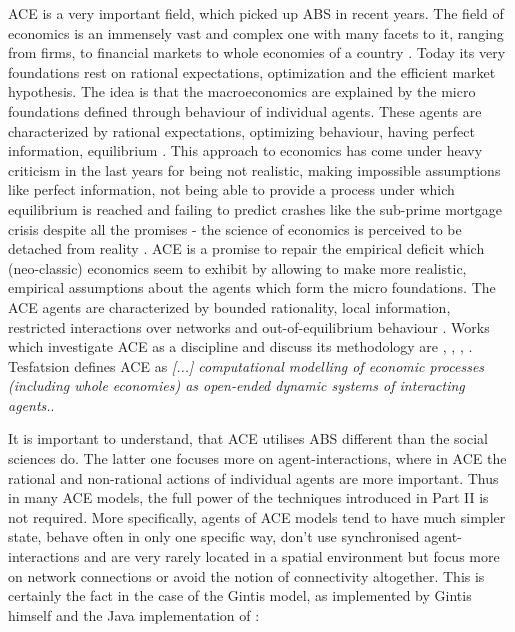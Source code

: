 ACE is a very important field, which picked up ABS in recent years. The field of economics is an immensely vast and complex one with many facets to it, ranging from firms, to financial markets to whole economies of a country \cite{bowles_understanding_2005}. Today its very foundations rest on rational expectations, optimization and the efficient market hypothesis. The idea is that the macroeconomics are explained by the micro foundations \cite{colell_microeconomic_1995} defined through behaviour of individual agents. These agents are characterized by rational expectations, optimizing behaviour, having perfect information, equilibrium \cite{focardi_is_2015}.
This approach to economics has come under heavy criticism in the last years for being not realistic, making impossible assumptions like perfect information, not being able to provide a process under which equilibrium is reached \cite{kirman_complex_2010} and failing to predict crashes like the sub-prime mortgage crisis despite all the promises - the science of economics is perceived to be detached from reality \cite{focardi_is_2015}. 
ACE is a promise to repair the empirical deficit which (neo-classic) economics seem to exhibit by allowing to make more realistic, empirical assumptions about the agents which form the micro foundations. The ACE agents are characterized by bounded rationality, local information, restricted interactions over networks and out-of-equilibrium behaviour \cite{farmer_economy_2009}. 
Works which investigate ACE as a discipline and discuss its methodology are \cite{tesfatsion_agent-based_2002}, \cite{richiardi_agent-based_2007}, \cite{ballot_agent-based_2015}, \cite{blume_introduction_2015}.
Tesfatsion \cite{tesfatsion_agent-based_2017} defines ACE as \textit{[...] computational modelling of economic processes (including whole economies) as open-ended dynamic systems of interacting agents.}. 

It is important to understand, that ACE utilises ABS different than the social sciences do. The latter one focuses more on agent-interactions, where in ACE the rational and non-rational actions of individual agents are more important. Thus in many ACE models, the full power of the techniques introduced in Part II is not required. More specifically, agents of ACE models tend to have much simpler state, behave often in only one specific way, don't use synchronised agent-interactions and are very rarely located in a spatial environment but focus more on network connections \cite{wilhite_economic_2006, glasserman_contagion_2015} or avoid the notion of connectivity altogether. This is certainly the fact in the case of the Gintis model, as implemented by Gintis himself and the Java implementation of \cite{evensen_extensible_2010}: 

